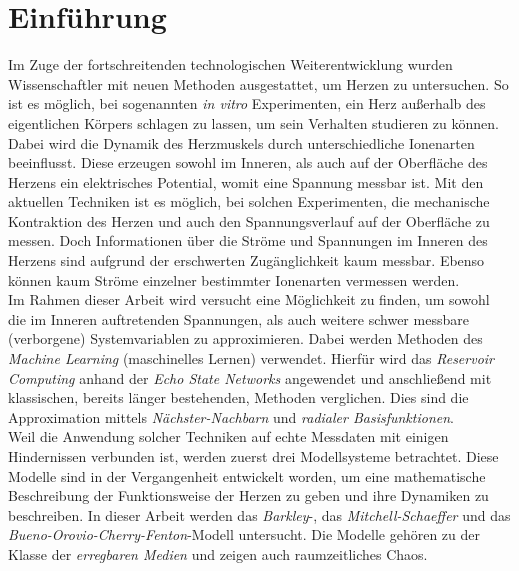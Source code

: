 \chapter{Einführung}
Im Zuge der fortschreitenden technologischen Weiterentwicklung wurden Wissenschaftler mit neuen Methoden ausgestattet, um Herzen zu untersuchen. So ist es möglich, bei sogenannten \textit{in vitro} Experimenten, ein Herz außerhalb des eigentlichen Körpers schlagen zu lassen, um sein Verhalten studieren zu können. Dabei wird die Dynamik des Herzmuskels durch unterschiedliche Ionenarten beeinflusst. Diese erzeugen sowohl im Inneren, als auch auf der Oberfläche des Herzens ein elektrisches Potential, womit eine Spannung messbar ist. Mit den aktuellen Techniken ist es möglich, bei solchen Experimenten, die mechanische Kontraktion des Herzen und auch den Spannungsverlauf auf der Oberfläche zu messen. Doch Informationen über die Ströme und Spannungen im Inneren des Herzens sind aufgrund der erschwerten Zugänglichkeit kaum messbar. Ebenso können kaum Ströme einzelner bestimmter Ionenarten vermessen werden. \\

Im Rahmen dieser Arbeit wird versucht eine Möglichkeit zu finden, um sowohl die im Inneren auftretenden Spannungen, als auch weitere schwer messbare (verborgene) Systemvariablen zu approximieren. Dabei werden Methoden des \textit{Machine Learning} (maschinelles Lernen) verwendet. Hierfür wird das \textit{Reservoir Computing} anhand der \textit{Echo State Networks} angewendet und anschließend mit klassischen, bereits länger bestehenden, Methoden verglichen. Dies sind die Approximation mittels \textit{Nächster-Nachbarn} und \textit{radialer Basisfunktionen}.\\
  
Weil die Anwendung solcher Techniken auf echte Messdaten mit einigen Hindernissen verbunden ist, werden zuerst drei Modellsysteme betrachtet. Diese Modelle sind in der Vergangenheit entwickelt worden, um eine mathematische Beschreibung der Funktionsweise der Herzen zu geben und ihre Dynamiken zu beschreiben. In dieser Arbeit werden das \textit{Barkley}-, das \textit{Mitchell-Schaeffer} und das \textit{Bueno-Orovio-Cherry-Fenton}-Modell untersucht. Die Modelle gehören zu der Klasse der \textit{erregbaren Medien} und zeigen auch raumzeitliches Chaos.\\

